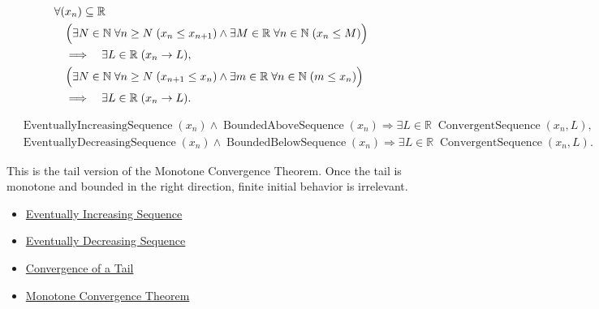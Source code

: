 \begin{remark*}
\[
\begin{aligned}
&\forall (x_n)\subseteq\mathbb{R}\\
&\quad\Bigl(
  \exists N\in\mathbb{N}\;\forall n\ge N\;(x_n\le x_{n+1})
  \land
  \exists M\in\mathbb{R}\;\forall n\in\mathbb{N}\;(x_n\le M)
\Bigr)\\
&\quad\Longrightarrow\quad
\exists L\in\mathbb{R}\;(x_n\to L),\\
&\quad\Bigl(
  \exists N\in\mathbb{N}\;\forall n\ge N\;(x_{n+1}\le x_n)
  \land
  \exists m\in\mathbb{R}\;\forall n\in\mathbb{N}\;(m\le x_n)
\Bigr)\\
&\quad\Longrightarrow\quad
\exists L\in\mathbb{R}\;(x_n\to L).
\end{aligned}
\]
\end{remark*}

\begin{remark*}
\[
\begin{aligned}
&\operatorname{EventuallyIncreasingSequence}(x_n)
\land
\operatorname{BoundedAboveSequence}(x_n)
\Longrightarrow
\exists L\in\mathbb{R}\;\operatorname{ConvergentSequence}(x_n,L),\\
&\operatorname{EventuallyDecreasingSequence}(x_n)
\land
\operatorname{BoundedBelowSequence}(x_n)
\Longrightarrow
\exists L\in\mathbb{R}\;\operatorname{ConvergentSequence}(x_n,L).
\end{aligned}
\]
\end{remark*}

\begin{remark*}[Interpretation]
This is the tail version of the Monotone Convergence Theorem. Once the tail is
monotone and bounded in the right direction, finite initial behavior is
irrelevant.
\end{remark*}

\begin{dependencies}
\begin{itemize}
  \item \hyperref[def:eventually-increasing-sequence]{Eventually Increasing Sequence}
  \item \hyperref[def:eventually-decreasing-sequence]{Eventually Decreasing Sequence}
  \item \hyperref[thm:convergence-of-tail]{Convergence of a Tail}
  \item \hyperref[thm:monotone-convergence-theorem]{Monotone Convergence Theorem}
\end{itemize}
\end{dependencies}

